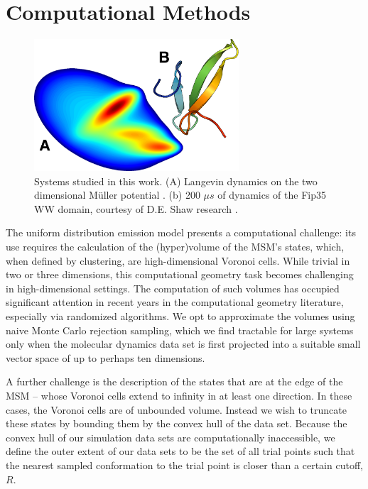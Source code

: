 \documentclass[journal=jpcbfk, layout=twocolumn, manuscript=article]{achemso}
\begin{document}
\section{Computational Methods}

\begin{figure}
\centering
\includegraphics[width=3in]{figs_final/mull_ww.png}
\caption{Systems studied in this work. (A) Langevin dynamics on the two dimensional M\"{u}ller potential \cite{Muller1980Reaction}. (b) 200 $\mu s$ of dynamics of the Fip35 WW domain\cite{Liu2008Experimental}, courtesy of D.E. Shaw research \cite{Shaw2010Atomic}.}
\end{figure}

The uniform distribution emission model presents a computational challenge: its use requires the calculation of the (hyper)volume of the MSM's states, which, when defined by clustering, are high-dimensional Voronoi cells. While trivial in two or three dimensions, this computational geometry task becomes challenging in high-dimensional settings. The computation of such volumes has occupied significant attention in recent years in the computational geometry literature, especially via randomized algorithms\cite{Kannan97, Simonovits03, Lovasz03}. We opt to approximate the volumes using naive Monte Carlo rejection sampling, which we find tractable for large systems only when the molecular dynamics data set is first projected into a suitable small vector space of up to perhaps ten dimensions.

A further challenge is the description of the states that are at the edge of the MSM -- whose Voronoi cells extend to infinity in at least one direction. In these cases, the Voronoi cells are of unbounded volume. Instead we wish to truncate these states by bounding them by the convex hull of the data set. Because the convex hull of our simulation data sets are computationally inaccessible, we define the outer extent of our data sets to be the set of all trial points such that the nearest sampled conformation to the trial point is closer than a certain cutoff, $R$.
\end{document}
